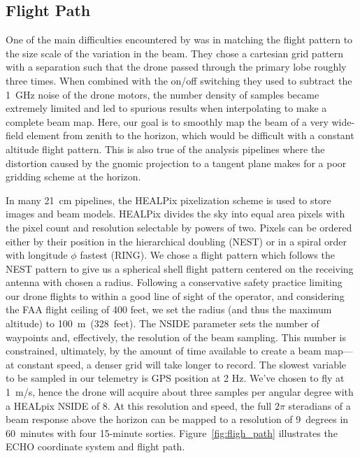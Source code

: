 \documentclass[preprint2,numberedappendix,tighten,twocolappendix]{aastex6}
\begin{document}
\subsection{Flight Path}

One of the main difficulties encountered by \citet{2015PASP..127.1131C} was in matching the flight pattern to the size scale of the variation in the beam.  They chose a cartesian grid pattern with a separation such that the drone passed through the primary lobe roughly three times.  When combined with the on/off switching they used to subtract the 1~GHz noise of the drone motors, the number density of samples became extremely limited and led to spurious results when interpolating to make a complete beam map.  Here, our goal is to smoothly map the beam of a very wide-field element from zenith to the horizon, which would be difficult with a constant altitude flight pattern.  This is also true of the analysis pipelines where the distortion caused by the gnomic projection to a tangent plane makes for a poor gridding scheme at the horizon. 

In many 21~cm pipelines, the HEALPix pixelization scheme \citep{Gorski:2005p7667} is used to store images and beam models.  HEALPix divides the sky into equal area pixels with the pixel count and resolution selectable by powers of two. Pixels can be ordered either by their position in the hierarchical doubling (NEST) or in a spiral order with  longitude $\phi$ fastest (RING).  We chose a flight pattern which follows the NEST pattern to give us a spherical shell flight pattern centered on the receiving antenna with chosen a radius. Following a conservative safety practice limiting our drone flights to within a good line of sight of the operator, and considering the FAA flight ceiling of 400 feet, we set the radius (and thus the maximum altitude) to 100~m~(328~feet). The NSIDE parameter sets the number of waypoints and, effectively, the resolution of the beam sampling.  This number is constrained, ultimately, by the amount of time available to create a beam map---at constant speed, a denser grid will take longer to record.  The slowest variable to be sampled in our telemetry is GPS position at 2 Hz. We've chosen to fly at 1~m/s, hence the drone will acquire about three samples per angular degree with a HEALpix NSIDE of 8.  At this resolution and speed, the full $2\pi$ steradians of a beam response above the horizon can be mapped to a resolution of 9~degrees in 60~minutes with four 15-minute sorties.  Figure~\ref{fig:fligh_path} illustrates the ECHO coordinate system and flight path.
\end{document}

